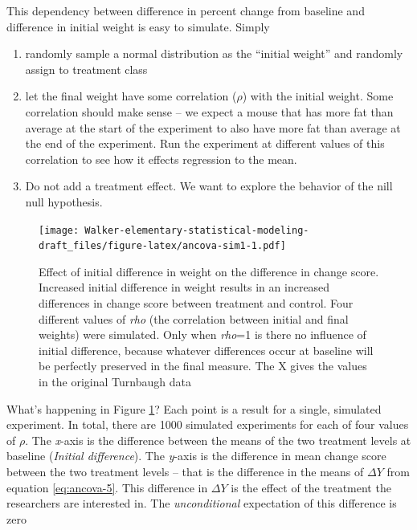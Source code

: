 \documentclass[]{book}
\providecommand{\tightlist}{%
  \setlength{\itemsep}{0pt}\setlength{\parskip}{0pt}}
\begin{document}
This dependency between difference in percent change from baseline and
difference in initial weight is easy to simulate. Simply

\begin{enumerate}
\def\labelenumi{\arabic{enumi}.}
\tightlist
\item
  randomly sample a normal distribution as the ``initial weight'' and
  randomly assign to treatment class
\item
  let the final weight have some correlation (\(\rho\)) with the initial
  weight. Some correlation should make sense -- we expect a mouse that
  has more fat than average at the start of the experiment to also have
  more fat than average at the end of the experiment. Run the experiment
  at different values of this correlation to see how it effects
  regression to the mean.
\item
  Do not add a treatment effect. We want to explore the behavior of the
  nill null hypothesis.
\end{enumerate}

\begin{figure}
\centering
\texttt{[image: Walker-elementary-statistical-modeling-draft\_files/figure-latex/ancova-sim1-1.pdf]}
\caption{\label{fig:ancova-sim1}Effect of initial difference in weight on
the difference in change score. Increased initial difference in weight
results in an increased differences in change score between treatment
and control. Four different values of \emph{rho} (the correlation
between initial and final weights) were simulated. Only when
\emph{rho}=1 is there no influence of initial difference, because
whatever differences occur at baseline will be perfectly preserved in
the final measure. The X gives the values in the original Turnbaugh
data}
\end{figure}

What's happening in Figure \ref{fig:ancova-sim1}? Each point is a result
for a single, simulated experiment. In total, there are 1000 simulated
experiments for each of four values of \(\rho\). The \emph{x}-axis is
the difference between the means of the two treatment levels at baseline
(\emph{Initial difference}). The \emph{y}-axis is the difference in mean
change score between the two treatment levels -- that is the difference
in the means of \(\Delta Y\) from equation \eqref{eq:ancova-5}. This
difference in \(\Delta Y\) is the effect of the treatment the
researchers are interested in. The \emph{unconditional} expectation of
this difference is zero
\end{document}
